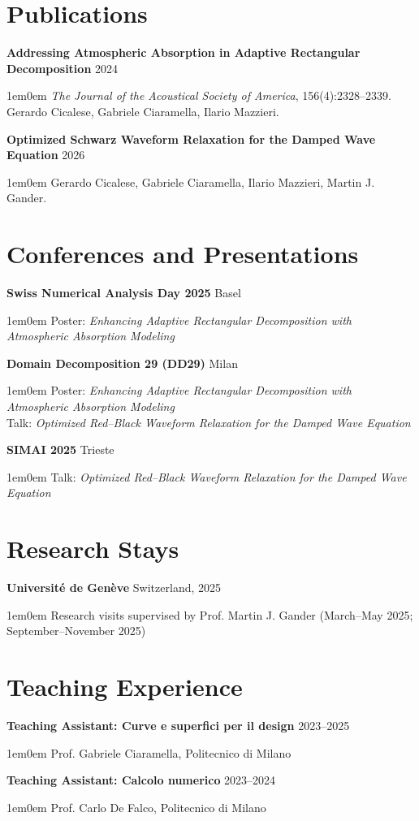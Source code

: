 \documentclass[11pt,a4paper]{article}
\newcommand{\cvdetail}[1]{%
  \begin{adjustwidth}{1em}{0em}
    #1
  \end{adjustwidth}%
  \vspace{0.5em}%
}
\newcommand{\cvsubitem}[2]{%
  \vspace{0.3em}%
  \noindent\textbf{#1} \hfill #2%
  \vspace{0.2em}%
}
\begin{document}
\section{Publications}

\cvsubitem{Addressing Atmospheric Absorption in Adaptive Rectangular Decomposition}{2024}
\cvdetail{\textit{The Journal of the Acoustical Society of America}, 156(4):2328--2339.\\Gerardo Cicalese, Gabriele Ciaramella, Ilario Mazzieri.}

\cvsubitem{Optimized Schwarz Waveform Relaxation for the Damped Wave Equation}{2026}
\cvdetail{Gerardo Cicalese, Gabriele Ciaramella, Ilario Mazzieri, Martin J. Gander.}

\newpage
\section{Conferences and Presentations}

\cvsubitem{Swiss Numerical Analysis Day 2025}{Basel}
\cvdetail{Poster: \textit{Enhancing Adaptive Rectangular Decomposition with Atmospheric Absorption Modeling}}

\cvsubitem{Domain Decomposition 29 (DD29)}{Milan}
\cvdetail{Poster: \textit{Enhancing Adaptive Rectangular Decomposition with Atmospheric Absorption Modeling}\\Talk: \textit{Optimized Red--Black Waveform Relaxation for the Damped Wave Equation}}

\cvsubitem{SIMAI 2025}{Trieste}
\cvdetail{Talk: \textit{Optimized Red--Black Waveform Relaxation for the Damped Wave Equation}}

\section{Research Stays}

\cvsubitem{Université de Genève}{Switzerland, 2025}
\cvdetail{Research visits supervised by Prof. Martin J. Gander (March--May 2025; September--November 2025)}

\section{Teaching Experience}

\cvsubitem{Teaching Assistant: Curve e superfici per il design}{2023--2025}
\cvdetail{Prof. Gabriele Ciaramella, Politecnico di Milano}

\cvsubitem{Teaching Assistant: Calcolo numerico}{2023--2024}
\cvdetail{Prof. Carlo De Falco, Politecnico di Milano}
\end{document}
